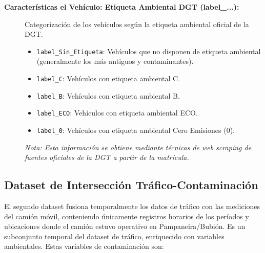 \begin{description}
    \item[\textbf{Características el Vehículo: Etiqueta Ambiental DGT (label\_...):}]
    Categorización de los vehículos según la etiqueta ambiental oficial de la DGT.
        \begin{itemize}
            \item \texttt{label\_Sin\_Etiqueta}: Vehículos que no disponen de etiqueta ambiental (generalmente los más antiguos y contaminantes).
            \item \texttt{label\_C}: Vehículos con etiqueta ambiental C.
            \item \texttt{label\_B}: Vehículos con etiqueta ambiental B.
            \item \texttt{label\_ECO}: Vehículos con etiqueta ambiental ECO.
            \item \texttt{label\_0}: Vehículos con etiqueta ambiental Cero Emisiones (0).
        \end{itemize}
        \textit{Nota: Esta información se obtiene mediante técnicas de web scraping de fuentes oficiales de la DGT a partir de la matrícula.}

\end{description}

\subsection*{Dataset de Intersección Tráfico-Contaminación}
\label{subsec:dataset_contaminacion}
El segundo dataset fusiona temporalmente los datos de tráfico con las mediciones del camión móvil, conteniendo únicamente registros horarios de los períodos y ubicaciones donde el camión estuvo operativo en Pampaneira/Bubión. Es un subconjunto temporal del dataset de tráfico, enriquecido con variables ambientales. Estas variables de contaminación son: 

